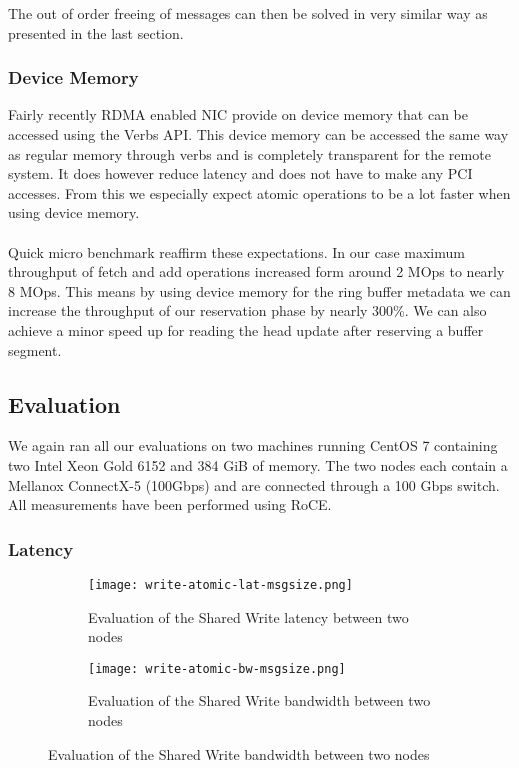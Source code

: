 The out of order freeing of messages can then be solved in very similar way as presented in the last section.


\subsubsection{Device Memory}
Fairly recently RDMA enabled NIC provide on device memory that can be accessed using the Verbs API. This device memory can 
be accessed the same way as regular memory through verbs and is completely transparent for the remote system. It does however
reduce latency and does not have to make any PCI accesses. From this we especially expect atomic operations to be a lot faster
when using device memory.

\paragraph{} Quick micro benchmark reaffirm these expectations. In our case maximum throughput of fetch and add operations 
increased form around 2 MOps to nearly 8 MOps. This means by using device memory for the ring buffer metadata we can increase
the throughput of our reservation phase by nearly 300\%. We can also achieve a minor speed up for reading the head update after
reserving a buffer segment.

\subsection{Evaluation}

We again ran all our evaluations on two machines running CentOS 7 containing two Intel Xeon Gold 6152 and 384 GiB of
memory. The two nodes each contain a Mellanox ConnectX-5 (100Gbps) and are connected through a 100 Gbps switch. 
All measurements have been performed using RoCE.

\subsubsection{Latency}

\begin{figure}[]
\begin{subfigure}[b]{0.49\textwidth}
  \centering
  \texttt{[image: write-atomic-lat-msgsize.png]}
  \caption{Evaluation of the Shared Write latency between two nodes}
  \label{fig:plot-write-atomic-lat}
\end{subfigure}
\begin{subfigure}[b]{0.49\textwidth}
  \centering
  \texttt{[image: write-atomic-bw-msgsize.png]}
  \caption{Evaluation of the Shared Write bandwidth between two nodes}
  \label{fig:plot-write-atomic-bw}

\end{subfigure}
\end{figure}

